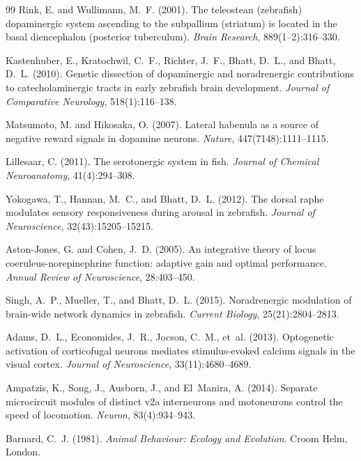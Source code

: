 \documentclass[12pt]{article}
\begin{document}
\begin{thebibliography}{99}
Rink, E. and Wullimann, M.~F. (2001).
The teleostean (zebrafish) dopaminergic system ascending to the subpallium
(striatum) is located in the basal diencephalon (posterior tuberculum).
\textit{Brain Research}, 889(1--2):316--330.

Kastenhuber, E., Kratochwil, C.~F., Richter, J.~F., Bhatt, D.~L., and
Bhatt, D.~L. (2010).
Genetic dissection of dopaminergic and noradrenergic contributions to
catecholaminergic tracts in early zebrafish brain development.
\textit{Journal of Comparative Neurology}, 518(1):116--138.

Matsumoto, M. and Hikosaka, O. (2007).
Lateral habenula as a source of negative reward signals in dopamine neurons.
\textit{Nature}, 447(7148):1111--1115.

Lillesaar, C. (2011).
The serotonergic system in fish.
\textit{Journal of Chemical Neuroanatomy}, 41(4):294--308.

Yokogawa, T., Hannan, M.~C., and Bhatt, D.~L. (2012).
The dorsal raphe modulates sensory responsiveness during arousal in zebrafish.
\textit{Journal of Neuroscience}, 32(43):15205--15215.

Aston-Jones, G. and Cohen, J.~D. (2005).
An integrative theory of locus coeruleus-norepinephrine function:
adaptive gain and optimal performance.
\textit{Annual Review of Neuroscience}, 28:403--450.

Singh, A.~P., Mueller, T., and Bhatt, D.~L. (2015).
Noradrenergic modulation of brain-wide network dynamics in zebrafish.
\textit{Current Biology}, 25(21):2804--2813.

Adams, D.~L., Economides, J.~R., Jocson, C.~M., et~al. (2013).
Optogenetic activation of corticofugal neurons mediates stimulus-evoked calcium signals in the visual cortex.
\textit{Journal of Neuroscience}, 33(11):4680--4689.

Ampatzis, K., Song, J., Ausborn, J., and El~Manira, A. (2014).
Separate microcircuit modules of distinct v2a interneurons and motoneurons control the speed of locomotion.
\textit{Neuron}, 83(4):934--943.

Barnard, C.~J. (1981).
\textit{Animal Behaviour: Ecology and Evolution}.
Croom Helm, London.


\end{thebibliography}
\end{document}
